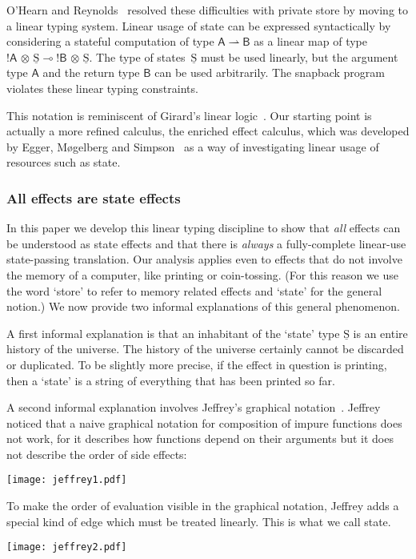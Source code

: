 \documentclass{LMCS}
\newcommand{\pto}{\rightharpoonup}
\newcommand{\VA}{\mathsf{A}}
\newcommand{\VB}{\mathsf{B}}
\newcommand{\tensor}{\otimes}
\newcommand{\ltensortype}[2]{{!} #1 \, {\tensor} \, #2}
\newcommand{\lfun}{\multimap}
\newcommand{\states}{{\underline{\mathrm{S}}}}
\begin{document}
O'Hearn and Reynolds~\cite{OHearn:R:00}
resolved these difficulties with private store
by moving to a linear typing system.
Linear usage of state can be expressed syntactically 
by considering a stateful computation of
type $\VA \pto \VB$ as a linear map of type $\ltensortype \VA
\states \lfun \ltensortype \VB\states$.  The type of states~$\states$
must be used linearly, but the argument type $\VA$ and the return type $\VB$
can be used arbitrarily. 
The snapback program violates these linear typing constraints.

This notation is reminiscent of Girard's linear
logic~\cite{DBLP:journals/tcs/Girard87}.  Our starting point is
actually a more refined calculus, the enriched effect calculus, which
was developed by Egger, M\o gelberg and
Simpson~\cite{EEC:journal,Mogelberg:CSL:09,Mogelberg:fossacs:10,EEC:LCPS:journal} as a
way of investigating linear usage of resources such as state.

\subsubsection*{All effects are state effects}
In this paper we develop this linear typing discipline to show that
\emph{all} effects can be understood as state effects and that there
is \emph{always} a fully-complete linear-use state-passing
translation.  Our analysis applies even to effects that do not involve
the memory of a computer, like printing or coin-tossing.  (For this
reason we use the word `store' to refer to memory related effects and
`state' for the general notion.)  We now provide two informal
explanations of this general phenomenon.

A first informal explanation is that an inhabitant of the `state' type 
$\states$ 
is an entire history of the universe. The history of the universe 
certainly cannot be discarded or duplicated. 
To be slightly more precise, if the effect in question is 
printing, then a `state' is a string of everything that has been printed
so far. 

A second informal explanation involves Jeffrey's 
graphical notation~\cite{jeffrey-premonoidal-graphics}.
Jeffrey noticed that a naive graphical notation for 
composition of impure functions does not work,
for it describes how functions depend on their arguments 
but it does not describe the order of side effects:
\\
\begin{center}
\texttt{[image: jeffrey1.pdf]}
\end{center}
To make the 
order of evaluation visible in the graphical notation, 
Jeffrey adds a special kind of edge which must be treated linearly.
This is what we call state.
\\
\begin{center}
\texttt{[image: jeffrey2.pdf]}
\end{center}
\end{document}
